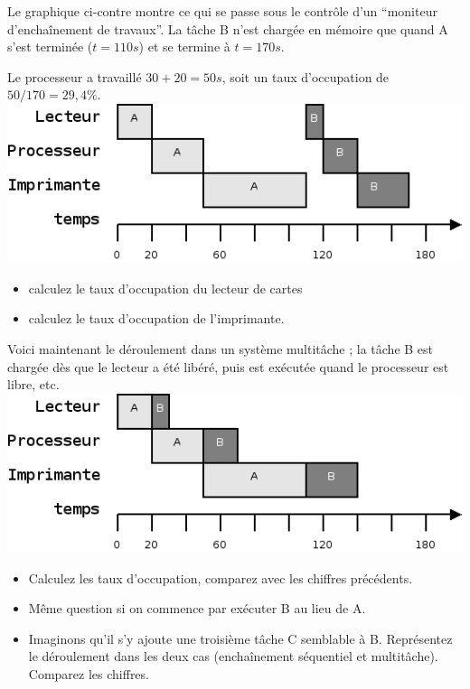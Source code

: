 \begin{multicols}{2}

Le graphique ci-contre montre ce qui se passe sous le contrôle d'un ``moniteur
d'enchaînement de travaux''. La tâche B n'est chargée en mémoire que
quand A s'est terminée ($t=110 s$) et se termine à $t=170 s$.

Le processeur a travaillé $30 + 20 = 50s$, soit un taux d'occupation de 
$50/170 = 29,4 \%$.
\includegraphics[width=.95\linewidth]{memoire-images/exemple-multitache-1.png}

\end{multicols}

\begin{exercice}
\begin{itemize}
\item calculez le taux d'occupation du lecteur de cartes
\item calculez le taux d'occupation de l'imprimante.
\end{itemize}
\end{exercice}

\begin{multicols}{2}
Voici maintenant le déroulement dans un système multitâche ; la tâche B est
chargée dès que le lecteur a été libéré, puis est exécutée quand le processeur
est libre, etc.
\includegraphics[width=.95\linewidth]{memoire-images/exemple-multitache-2.png}
\end{multicols}

\begin{exercice}
\begin{itemize}
\item Calculez les taux d'occupation, comparez avec les chiffres précédents.
\item Même question si on commence par exécuter B au lieu de A.
\item Imaginons qu'il s'y ajoute une troisième tâche C semblable à B. Représentez 
le déroulement dans les deux cas (enchaînement séquentiel et multitâche). Comparez les chiffres.
\end{itemize}
\end{exercice}

